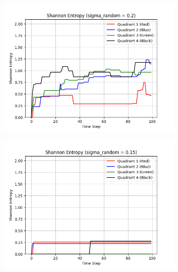 \documentclass[]{scrartcl}
\begin{document}
\begin{figure}[h!]
\begin{subfigure}[c]{0.49\textwidth}
    \end{subfigure}\hfill
    \begin{subfigure}[c]{0.49\textwidth}
        \includegraphics[width=\linewidth]{Shannon_Entropy_(sigma_random_=_0.2).png}
    \end{subfigure}\hfill
    \begin{subfigure}[c]{0.49\textwidth}
        \includegraphics[width=\linewidth]{Shannon_Entropy_(sigma_random_=_0.15).png}
    \end{subfigure}\hfill
    \begin{subfigure}[c]{0.49\textwidth}

\end{subfigure}
\end{figure}
\end{document}

